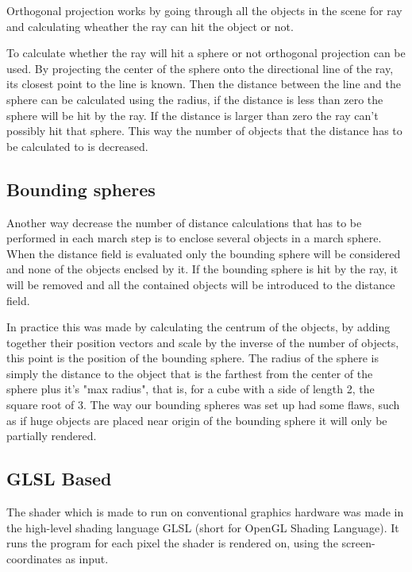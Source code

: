 			Orthogonal projection works by going through all the objects in the 
			scene for ray and calculating wheather the ray can hit the object
			or not. 

			To calculate whether the ray will hit a sphere or not orthogonal
			projection can be used. By projecting the center of the sphere onto
			the directional line of the ray, its closest point to the line is
			known.  Then the distance between the line and the sphere can be
			calculated using the radius, if the distance is less than zero the
			sphere will be hit by the ray. If the distance is larger than zero
			the ray can't possibly hit that sphere. This way the number of
			objects that the distance has to be calculated to is decreased.

		\subsection{Bounding spheres}
			
			Another way decrease the number of distance calculations that has
			to be performed in each march step is to enclose several objects in
			a march sphere. When the distance field is evaluated only the
			bounding sphere will be considered and none of the objects enclsed
			by it. If the bounding sphere is hit by the ray, it will be removed
			and all the contained objects will be introduced to the distance
			field. 

			In practice this was made by calculating the centrum of the
			objects, by adding together their position vectors and scale by the
			inverse of the number of objects, this point is the position of the
			bounding sphere. The radius of the sphere is simply the distance to
			the object that is the farthest from the center of the sphere plus
			it's "max radius", that is, for a cube with a side of length 2, the
			square root of 3. The way our bounding spheres was set up had some
			flaws, such as if huge objects are placed near origin of the
			bounding sphere it will only be partially rendered.


		\subsection{GLSL Based}
		
			The shader which is made to run on conventional graphics hardware
			was made in the high-level shading language GLSL (short for OpenGL
			Shading Language). It runs the program for each pixel the shader is
			rendered on, using the screen-coordinates as input.
			
